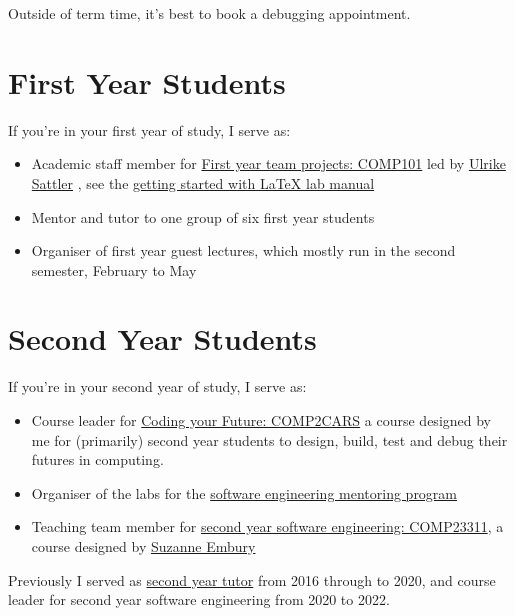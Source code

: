 \documentclass[
  12pt,
]{book}
\providecommand{\tightlist}{%
  \setlength{\itemsep}{0pt}\setlength{\parskip}{0pt}}
\begin{document}
Outside of term time, it's best to book a debugging appointment. 🐛

\hypertarget{year1}{%
\section{First Year Students}\label{year1}}

If you're in your first year of study, I serve as:

\begin{itemize}
\tightlist
\item
  Academic staff member for \href{https://studentnet.cs.manchester.ac.uk/ugt/COMP10120/syllabus/}{First year team projects: COMP101} led by \href{http://www.cs.man.ac.uk/~sattler/}{Ulrike Sattler} \citep{COMP10120}, see the \href{http://latex4year1.netlify.app}{getting started with LaTeX lab manual}
\item
  Mentor and tutor to one group of six first year students
\item
  Organiser of first year guest lectures, which mostly run in the second semester, February to May
\end{itemize}

\hypertarget{year2}{%
\section{Second Year Students}\label{year2}}

If you're in your second year of study, I serve as:

\begin{itemize}
\tightlist
\item
  Course leader for \href{https://www.cdyf.me/}{Coding your Future: COMP2CARS} a course designed by me for (primarily) second year students to design, build, test and debug their futures in computing.
\item
  Organiser of the labs for the \href{https://www.cs.manchester.ac.uk/connect/business-engagement/industrial-mentoring/}{software engineering mentoring program}
\item
  Teaching team member for \href{https://studentnet.cs.manchester.ac.uk/ugt/COMP23311/syllabus/}{second year software engineering: COMP23311}, a course designed by \href{http://www.cs.man.ac.uk/~embury/}{Suzanne Embury} \citep{COMP23311, git}
\end{itemize}

Previously I served as \href{https://studentnet.cs.manchester.ac.uk/ugt/year2/}{second year tutor} from 2016 through to 2020, and course leader for second year software engineering from 2020 to 2022.
\end{document}
